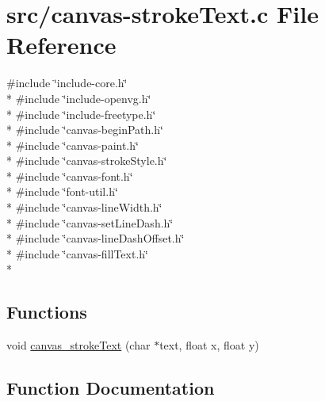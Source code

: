\hypertarget{canvas-strokeText_8c}{}\section{src/canvas-\/stroke\+Text.c File Reference}
\label{canvas-strokeText_8c}
{\ttfamily \#include \char`\"{}include-\/core.\+h\char`\"{}}\\*
{\ttfamily \#include \char`\"{}include-\/openvg.\+h\char`\"{}}\\*
{\ttfamily \#include \char`\"{}include-\/freetype.\+h\char`\"{}}\\*
{\ttfamily \#include \char`\"{}canvas-\/begin\+Path.\+h\char`\"{}}\\*
{\ttfamily \#include \char`\"{}canvas-\/paint.\+h\char`\"{}}\\*
{\ttfamily \#include \char`\"{}canvas-\/stroke\+Style.\+h\char`\"{}}\\*
{\ttfamily \#include \char`\"{}canvas-\/font.\+h\char`\"{}}\\*
{\ttfamily \#include \char`\"{}font-\/util.\+h\char`\"{}}\\*
{\ttfamily \#include \char`\"{}canvas-\/line\+Width.\+h\char`\"{}}\\*
{\ttfamily \#include \char`\"{}canvas-\/set\+Line\+Dash.\+h\char`\"{}}\\*
{\ttfamily \#include \char`\"{}canvas-\/line\+Dash\+Offset.\+h\char`\"{}}\\*
{\ttfamily \#include \char`\"{}canvas-\/fill\+Text.\+h\char`\"{}}\\*
\subsection*{Functions}
\begin{DoxyCompactItemize}
\item 
void \hyperlink{canvas-strokeText_8c_a13a88482f1dfc63c00ce113fce5bdeb2}{canvas\+\_\+stroke\+Text} (char $\ast$text, float x, float y)
\end{DoxyCompactItemize}


\subsection{Function Documentation}
\hypertarget{canvas-strokeText_8c_a13a88482f1dfc63c00ce113fce5bdeb2}{}
